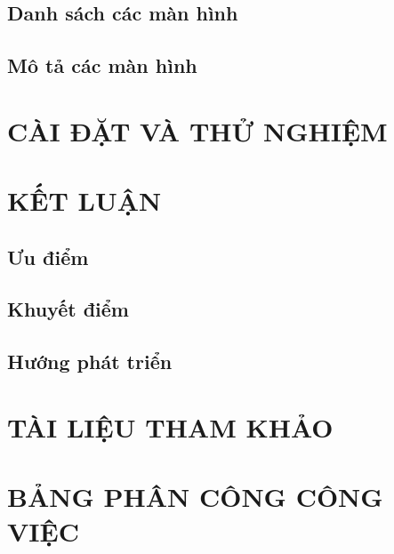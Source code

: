 \documentclass[a4paper]{article}
\begin{document}
	\subsection{Danh sách các màn hình}
	\subsection{Mô tả các màn hình}

\section{CÀI ĐẶT VÀ THỬ NGHIỆM}

\section{KẾT LUẬN}
	\subsection{Ưu điểm}


	\subsection{Khuyết điểm}
	\subsection{Hướng phát triển}

\section{TÀI LIỆU THAM KHẢO}

\section{BẢNG PHÂN CÔNG CÔNG VIỆC}
\end{document}

